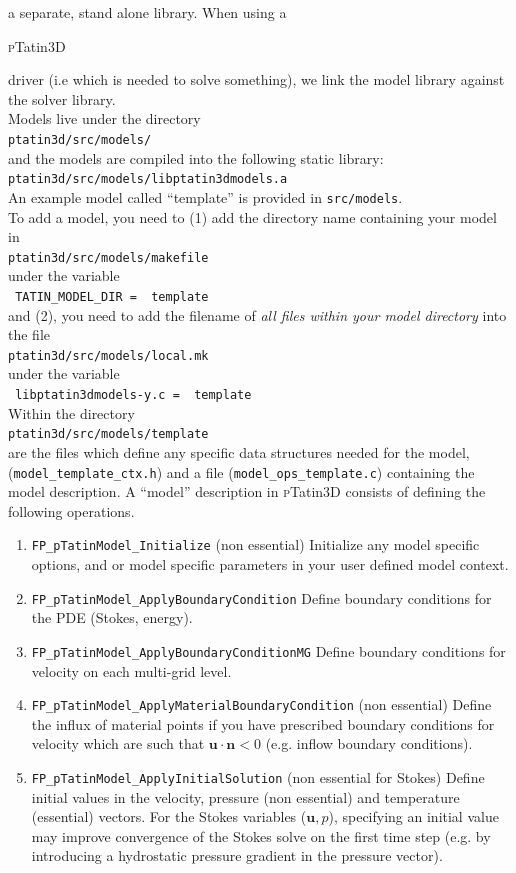 \documentclass[paper=a4, fontsize=11pt,twoside]{scrartcl}
\newcommand{\ptat}{{{\textsc pTatin3D}}}
\newcommand{\shellcmd}[1]{\\\indent\indent\texttt{\hspace{5mm}\footnotesize #1}\\}
\newcommand{\unix}[1]{\texttt{\footnotesize #1}}
\begin{document}
a separate, stand alone library. When using a {\ptat{ driver (i.e which is needed to solve something),
we link the model library against the solver library.
\\[8pt]
Models live under the directory
	\shellcmd{ptatin3d/src/models/}
and the models are compiled into the following static library:
	\shellcmd{ptatin3d/src/models/libptatin3dmodels.a}
An example model called ``template'' is provided in \unix{src/models}.
\\[8pt]
To add a model, you need to (1) add the directory name containing your model in
	\shellcmd{ptatin3d/src/models/makefile}
under the variable
	\shellcmd{
	TATIN\_MODEL\_DIR = \
        template
	}
and (2), you need to add the filename of \textit{all files within your model directory} into the file
	\shellcmd{ptatin3d/src/models/local.mk}
under the variable
	\shellcmd{
	libptatin3dmodels-y.c = \
        template
	}
Within the directory
	\shellcmd{ptatin3d/src/models/template}
are the files which define any specific data structures needed for the model,
	(\unix{model\_template\_ctx.h})
and a file (\unix{model\_ops\_template.c}) containing the model description.
A ``model'' description in {\ptat} consists of defining the following operations.
\begin{enumerate}
	\item \unix{FP\_pTatinModel\_Initialize} (non essential)
	Initialize any model specific options, and or model specific parameters in your user defined model context.

	\item \unix{FP\_pTatinModel\_ApplyBoundaryCondition}
	Define boundary conditions for the PDE (Stokes, energy).

	\item \unix{FP\_pTatinModel\_ApplyBoundaryConditionMG}
	Define boundary conditions for velocity on each multi-grid level.

	\item \unix{FP\_pTatinModel\_ApplyMaterialBoundaryCondition} (non essential)
	Define the influx of material points if you have prescribed boundary conditions for velocity which are such that $\boldsymbol u \cdot \boldsymbol n < 0$ (e.g. inflow boundary conditions).

	\item \unix{FP\_pTatinModel\_ApplyInitialSolution} (non essential for Stokes)
	Define initial values in the velocity, pressure (non essential) and temperature (essential) vectors. For the Stokes variables ($\boldsymbol u,p$), specifying an initial value may improve convergence of the Stokes solve on the first time step (e.g. by introducing a hydrostatic pressure gradient in the pressure vector).
	

\end{enumerate}}}
\end{document}
